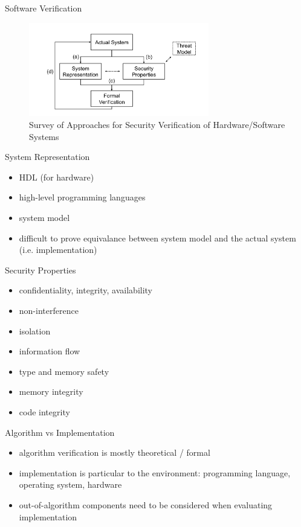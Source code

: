 \documentclass{curs}
\begin{document}
\begin{frame}{Software Verification}
  \begin{figure}
    \centering
    \includegraphics[width=0.7\textwidth]{img/software-verification-procedure} \\
    {\tiny Survey of Approaches for Security Verification of Hardware/Software Systems}
  \end{figure}
\end{frame}

\begin{frame}{System Representation}
  \begin{itemize}
    \item HDL (for hardware)
    \item high-level programming languages
    \item system model
    \item difficult to prove equivalance between system model and the actual system (i.e. implementation)
  \end{itemize}
\end{frame}

\begin{frame}{Security Properties}
  \begin{itemize}
    \item confidentiality, integrity, availability
    \item non-interference
    \item isolation
    \item information flow
    \item type and memory safety
    \item memory integrity
    \item code integrity
  \end{itemize}
\end{frame}

\begin{frame}{Algorithm vs Implementation}
  \begin{itemize}
    \item algorithm verification is mostly theoretical / formal
    \item implementation is particular to the environment: programming language, operating system, hardware
    \item out-of-algorithm components need to be considered when evaluating implementation
  \end{itemize}
\end{frame}
\end{document}
